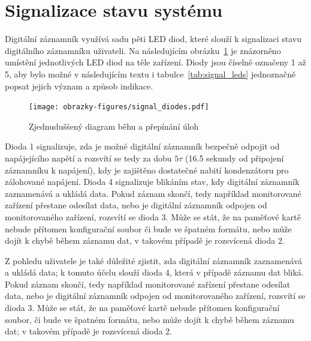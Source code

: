 \section{Signalizace stavu systému}
\label{signalizace_stavu_systemu}
Digitální záznamník využívá sadu pěti LED diod, které slouží k signalizaci stavu digitálního záznamníku uživateli. Na následujícím obrázku~\ref{fig:signal-diodes} je znázorněno umístění jednotlivých LED diod na těle zařízení. Diody jsou číselně označeny 1 až 5, aby bylo možné v následujícím textu i tabulce~\ref{tab:signal_leds} jednoznačně popsat jejich význam a způsob indikace.

\begin{figure}[h]
    \centering
    \texttt{[image: obrazky-figures/signal\_diodes.pdf]}
    
    \caption{Zjednuduššený diagram běhu a přepínání úloh}
    \label{fig:signal-diodes}
\end{figure}

Dioda 1 signalizuje, zda je možné digitální záznamník bezpečně odpojit od napájejícího napětí a rozsvítí se tedy za dobu $5\tau$ (16.5 sekundy od připojení záznamníku k napájení), kdy je zajištěno dostatečné nabití kondenzátoru pro zálohované napájení. Dioda 4 signalizuje blikáním stav, kdy digitální záznamník zaznamenává a ukládá data. Pokud záznam skončí, tedy například monitorované zařízení přestane odesílat data, nebo je digitální záznamník odpojen od monitorovaného zařízení, rozsvítí se dioda 3. Může se stát, že na paměťové kartě nebude přítomen konfigurační soubor či bude ve špatném formátu, nebo může dojít k chybě během záznamu dat, v takovém případě je rozsvícená dioda 2.

Z pohledu uživatele je také důležité zjistit, zda digitální záznamník zaznamenává a ukládá data; k tomuto účelu slouží dioda 4, která v případě záznamu dat bliká. Pokud záznam skončí, tedy například monitorované zařízení přestane odesílat data, nebo je digitální záznamník odpojen od monitorovaného zařízení, rozsvítí se dioda 3. Může se stát, že na paměťové kartě nebude přítomen konfigurační soubor, či bude ve špatném formátu, nebo může dojít k chybě během záznamu dat; v takovém případě je rozsvícená dioda 2.

